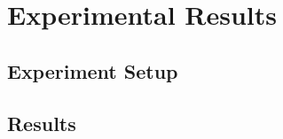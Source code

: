 \chapter{Experimental Results}
\label{ch:experimental-results}

\section{Experiment Setup}

\section{Results}
